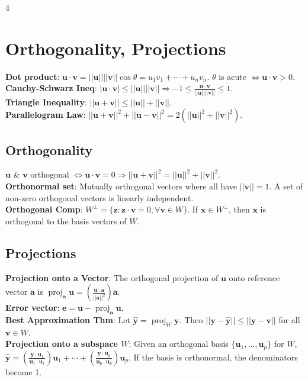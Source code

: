 \documentclass[9pt]{extarticle}
\begin{document}
\begin{multicols*}{4}
\section*{Orthogonality, Projections}
\textbf{Dot product}: $\mathbf{u}\cdot \mathbf{v}=||\mathbf{u}||||\mathbf{v}||\cos\theta=u_{1}v_{1}+\cdots+u_{n}v_{n}$. $\theta$ is acute $\Leftrightarrow \mathbf{u}\cdot \mathbf{v}>0$.\\
\textbf{Cauchy-Schwarz Ineq}: $|\mathbf{u}\cdot \mathbf{v}|\le||\mathbf{u}||||\mathbf{v}||\Rightarrow-1\le\frac{\mathbf{u}\cdot \mathbf{v}}{||\mathbf{u}||||\mathbf{v}||}\le1$.\\
\textbf{Triangle Inequality}: $||\mathbf{u}+\mathbf{v}||\le||\mathbf{u}||+||\mathbf{v}||$.\\
\textbf{Parallelogram Law}: $||\mathbf{u}+\mathbf{v}||^{2}+||\mathbf{u}-\mathbf{v}||^{2}=2(||\mathbf{u}||^{2}+||\mathbf{v}||^{2})$.\\

\subsection*{Orthogonality}
$\mathbf{u}$ \& $\mathbf{v}$ orthogonal $\Leftrightarrow \mathbf{u}\cdot \mathbf{v}=0 \Rightarrow ||\mathbf{u}+\mathbf{v}||^{2}=||\mathbf{u}||^{2}+||\mathbf{v}||^{2}$.\\
\textbf{Orthonormal set}: Mutually orthogonal vectors where all have $||\mathbf{v}||=1$. A set of non-zero orthogonal vectors is linearly independent.\\
\textbf{Orthogonal Comp}: $W^{\perp}=\{\mathbf{z}:\mathbf{z}\cdot \mathbf{v}=0,\forall \mathbf{v}\in W\}$. If $\mathbf{x}\in W^\perp$, then $\mathbf{x}$ is orthogonal to the basis vectors of $W$.

\subsection*{Projections}
\textbf{Projection onto a Vector}: The orthogonal projection of $\mathbf{u}$ onto reference vector $\mathbf{a}$ is $\operatorname{proj}_{\mathbf{a}}\mathbf{u}=(\frac{\mathbf{u}\cdot \mathbf{a}}{||\mathbf{a}||^{2}})\mathbf{a}$.\\
\textbf{Error vector}: $\mathbf{e}=\mathbf{u}-\operatorname{proj}_{\mathbf{a}}\mathbf{u}$.\\
\textbf{Best Approximation Thm}: Let $\hat{\mathbf{y}} = \operatorname{proj}_W \mathbf{y}$. Then $||\mathbf{y}-\hat{\mathbf{y}}||\le||\mathbf{y}-\mathbf{v}||$ for all $\mathbf{v}\in W$.\\
\textbf{Projection onto a subspace $W$}: Given an orthogonal basis $\{\mathbf{u}_{1},\dots,\mathbf{u}_{p}\}$ for $W$, $\hat{\mathbf{y}}=(\frac{\mathbf{y}\cdot \mathbf{u}_{1}}{\mathbf{u}_{1}\cdot \mathbf{u}_{1}})\mathbf{u}_{1}+\cdots+(\frac{\mathbf{y}\cdot \mathbf{u}_{p}}{\mathbf{u}_{p}\cdot \mathbf{u}_{p}})\mathbf{u}_{p}$. If the basis is orthonormal, the denominators become 1.


\end{multicols*}
\end{document}
